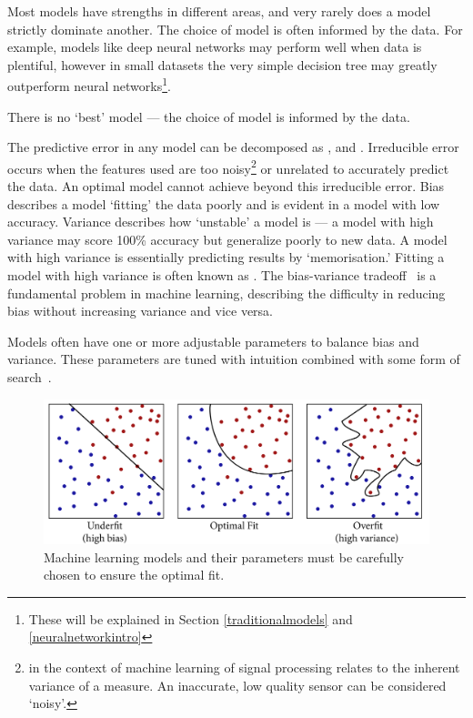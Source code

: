 \documentclass[12pt, twoside]{book}
\renewcommand\emph[1]{\textit{\color{USred}{#1}}}
\begin{document}
Most models have strengths in different areas, and very rarely does a model strictly dominate another. The choice of model is often informed by the data. For example, models like deep neural networks may perform well when data is plentiful, however in small datasets the very simple decision tree may greatly outperform neural networks\footnote{These will be explained in Section \ref{traditionalmodels} and \ref{neuralnetworkintro}}.



\begin{highlight}
There is no `best' model --- the choice of model is informed by the data. 
\end{highlight}

The predictive error in any model can be decomposed as \emph{irreducible error}, \emph{bias} and \emph{variance}. Irreducible error occurs when the features used are too noisy\footnote{\emph{Noisy} in the context of machine learning of signal processing relates to the inherent variance of a measure. An inaccurate, low quality sensor can be considered `noisy'.} or unrelated to accurately predict the data. An optimal model cannot achieve beyond this irreducible error. Bias describes a model `fitting' the data poorly and is evident in a model with low accuracy. Variance describes how `unstable' a model is --- a model with high variance may score 100\% accuracy but generalize poorly to new data. A model with high variance is essentially predicting results by `memorisation.' Fitting a model with high variance is often known as \emph{overfitting}. The bias-variance tradeoff~\cite{biasvarnn} is a fundamental problem in machine learning, describing the difficulty in reducing bias without increasing variance and vice versa. 

Models often have one or more adjustable parameters to balance bias and variance. These parameters are tuned with intuition combined with some form of search~\cite{gridsearch, tpe}. 

\begin{figure}[h]
\label{overfitex}
\centering\includegraphics[width=1\linewidth]{overfit2.png}
\caption{Machine learning models and their parameters must be carefully chosen to ensure the optimal fit.}
\end{figure}
\end{document}
